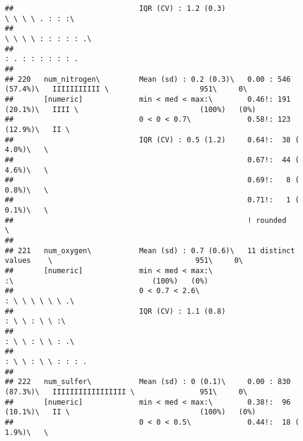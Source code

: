 \documentclass[]{article}
\begin{document}
\begin{verbatim}
##                             IQR (CV) : 1.2 (0.3)                           \ \ \ \ . : : :\                                    
##                                                                            \ \ \ \ : : : : : .\                                
##                                                                            : . : : : : : : .                                   
## 
## 220   num_nitrogen\         Mean (sd) : 0.2 (0.3)\   0.00 : 546 (57.4%)\   IIIIIIIIIII \                     951\     0\       
##       [numeric]             min < med < max:\        0.46!: 191 (20.1%)\   IIII \                            (100%)   (0%)     
##                             0 < 0 < 0.7\             0.58!: 123 (12.9%)\   II \                                                
##                             IQR (CV) : 0.5 (1.2)     0.64!:  38 ( 4.0%)\   \                                                   
##                                                      0.67!:  44 ( 4.6%)\   \                                                   
##                                                      0.69!:   8 ( 0.8%)\   \                                                   
##                                                      0.71!:   1 ( 0.1%)\   \                                                   
##                                                      ! rounded             \                                                   
## 
## 221   num_oxygen\           Mean (sd) : 0.7 (0.6)\   11 distinct values    \                                 951\     0\       
##       [numeric]             min < med < max:\                              :\                                (100%)   (0%)     
##                             0 < 0.7 < 2.6\                                 : \ \ \ \ \ \ .\                                    
##                             IQR (CV) : 1.1 (0.8)                           : \ \ : \ \ :\                                      
##                                                                            : \ \ : \ \ : .\                                    
##                                                                            : \ \ : \ \ : : : .                                 
## 
## 222   num_sulfer\           Mean (sd) : 0 (0.1)\     0.00 : 830 (87.3%)\   IIIIIIIIIIIIIIIII \               951\     0\       
##       [numeric]             min < med < max:\        0.38!:  96 (10.1%)\   II \                              (100%)   (0%)     
##                             0 < 0 < 0.5\             0.44!:  18 ( 1.9%)\   \                                                   

\end{verbatim}
\end{document}
